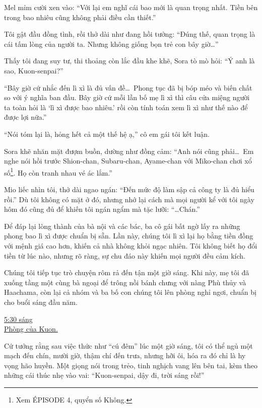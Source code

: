 \documentclass[../main.tex]{subfiles}
\begin{document}
Mel mỉm cười xen vào: ``Với lại em nghĩ cái bao mới là quan trọng nhất. Tiền bên trong bao nhiêu cũng không phải điều cần thiết.''

Tôi gật đầu đồng tình, rồi thở dài như đang hồi tưởng: ``Đúng thế, quan trọng là cái tấm lòng của người ta. Nhưng không giống bọn trẻ con bây giờ\dots''

Thấy tôi đang suy tư, thi thoảng còn lắc đầu khe khẽ, Sora tò mò hỏi: ``Ý anh là sao, Kuon-senpai?''

``Bây giờ cứ nhắc đến lì xì là đủ vấn đề\dots\ Phong tục đã bị bóp méo và biến chất so với ý nghĩa ban đầu. Bây giờ cứ mỗi lần bố mẹ lì xì thì câu cửa miệng người ta toàn hỏi là `lì xì được bao nhiêu.' rồi còn tính toán xem lì xì như thế nào để được lợi nữa.''

``Nói tóm lại là, hỏng hết cả một thế hệ ạ,'' cô em gái tôi kết luận.

Sora khẽ nhăn mặt đượm buồn, dường như đồng cảm: ``Anh nói cũng phải\dots\ Em nghe nói hồi trước Shion-chan, Subaru-chan, Ayame-chan với Miko-chan chơi xổ số\footnote{Xem {\flaregothic ÉPISODE 4}, quyển số Không.}. Họ còn tranh nhau vé ác lắm.''

Mio liếc nhìn tôi, thở dài ngao ngán: ``Đến mức độ làm sập cả công ty là đủ hiểu rồi.'' Dù tôi không có mặt ở đó, nhưng nhớ lại cách mà mọi người kể với tôi ngày hôm đó cũng đủ để khiến tôi ngán ngẩm mà tặc lưỡi: ``\dots Chán.''

Để đáp lại lòng thành của bà nội và các bác, ba cô gái bất ngờ lấy ra những phong bao lì xì được chuẩn bị sẵn. Lần này, chúng tôi lì xì lại họ bằng tiền đồng với mệnh giá cao hơn, khiến cả nhà không khỏi ngạc nhiên. Tôi không biết họ đổi tiền từ lúc nào, nhưng rõ ràng, sự chu đáo này khiến mọi người đều cảm kích.

Chúng tôi tiếp tục trò chuyện rôm rả đến tận một giờ sáng. Khi này, mẹ tôi đã xuống tầng một cùng bà ngoại để trông nồi bánh chưng với nàng Phù thủy và Haachama, còn lại cả nhóm và ba bố con chúng tôi lên phòng nghỉ ngơi, chuẩn bị cho buổi sáng đầu năm.

\begin{center}
  \uline{5:30 sáng\\Phòng của Kuon.}
\end{center}

Cứ tưởng rằng sau việc thức như ``cú đêm'' lúc một giờ sáng, tôi có thể ngủ một mạch đến chín, mười giờ, thậm chí đến trưa, nhưng hỡi ôi, hóa ra đó chỉ là hy vọng hão huyền. Một giọng nói trong trẻo, tinh nghịch vang lên bên tai, kèm theo những cái thúc nhẹ vào vai: ``Kuon-senpai, dậy đi, trời sáng rồi!''
\end{document}
